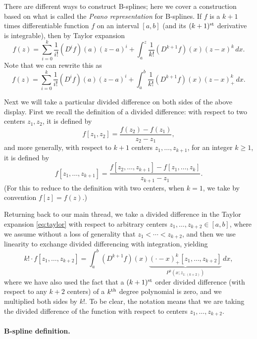\documentclass{article}
\begin{document}
There are different ways to construct B-splines; here we cover a construction
based on what is called the \emph{Peano representation} for B-splines. If $f$ is
a $k+1$ times differentiable function $f$ on an interval $[a,b]$ (and its
$(k+1)^{\text{st}}$ derivative is integrable), then by Taylor expansion
\[
f(z) = \sum_{i=0}^k \frac{1}{i!} (D^i f)(a) (z-a)^i + 
\int_a^z \frac{1}{k!} (D^{k+1} f)(x) (z-x)^k \, dx.
\]
Note that we can rewrite this as
\begin{equation}
\label{eq:taylor}
f(z) = \sum_{i=0}^k \frac{1}{i!} (D^i f)(a) (z-a)^i + 
\int_a^b \frac{1}{k!} (D^{k+1} f)(x) (z-x)^k_+ \, dx. 
\end{equation}

Next we will take a particular divided difference on both sides of the above
display. First we recall the definition of a divided difference: with respect to
two centers $z_1,z_2$, it is defined by       
\[
f[z_1,z_2] =  \frac{f(z_2)-f(z_1)}{z_2-z_1},
\]
and more generally, with respect to $k+1$ centers $z_1,\dots,z_{k+1}$, for an
integer $k \geq 1$, it is defined by  
\[
f[z_1,\dots,z_{k+1}] = \frac{f[z_2,\dots,z_{k+1}] -
f[z_1,\dots,z_k]}{z_{k+1}-z_1}.
\]
(For this to reduce to the definition with two centers, when $k=1$, we take by 
convention $f[z]=f(z)$.)   

Returning back to our main thread, we take a divided difference in the Taylor
expansion \eqref{eq:taylor} with respect to arbitrary centers $z_1,\dots,z_{k+2}
\in [a,b]$, where we assume without a loss of generality that $z_1 < \cdots <
z_{k+2}$, and then we use linearity to exchange divided differencing with
integration, yielding   
\begin{equation}
\label{eq:peano}
k! \cdot f[z_1,\dots,z_{k+2}] = \int_a^b (D^{k+1} f)(x)
\underbrace{(\cdot-x)^k_+[z_1,\dots,z_{k+2}]}_{P^k(x; z_{1:(k+2)})} \, dx, 
\end{equation}
where we have also used the fact that a $(k+1)^{\text{st}}$ order divided difference (with
respect to any $k+2$ centers) of a $k^{\text{th}}$ degree polynomial is zero, and we
multiplied both sides by $k!$. To be clear, the notation  means that we are taking the divided difference of
the function  with respect to centers
$z_1,\dots,z_{k+2}$.    

\paragraph{B-spline definition.}  
\end{document}
